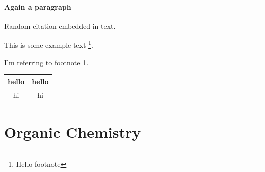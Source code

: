 \documentclass[a4paper]{article}
\begin{document}
	\paragraph{Again a paragraph}
	Random citation \cite{DUMMY:1} embedded in text.\cite{DUMMY:2}
	
	This is some example text \footnote{\label{myFootnote} Hello  footnote}.
	
	I'm referring to footnote \ref{myFootnote}.
	
	\begin{tabular}{|c|c|}
		\hline 
		hello & hello \\ 
		\hline 
		hi & hi \\ 
		\hline 
	\end{tabular} 
	
	\newpage
	\section{Organic Chemistry}
	
	
	\newpage	
	
	
\end{document}
